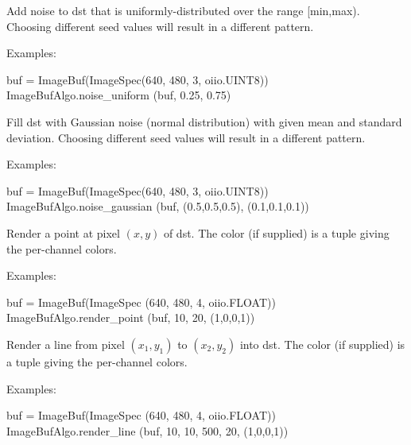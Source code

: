Add noise to {\cf dst} that is uniformly-distributed over the range
{\cf [min,max)}.  Choosing different seed values will result in a different pattern.

\smallskip
\noindent Examples:
\begin{code}
    buf = ImageBuf(ImageSpec(640, 480, 3, oiio.UINT8))
    ImageBufAlgo.noise_uniform (buf, 0.25, 0.75)
\end{code}
\apiend


 

Fill {\cf dst} with Gaussian noise (normal distribution) with given mean
and standard deviation.
Choosing different seed values will result in a different pattern.

\smallskip
\noindent Examples:
\begin{code}
    buf = ImageBuf(ImageSpec(640, 480, 3, oiio.UINT8))
    ImageBufAlgo.noise_gaussian (buf, (0.5,0.5,0.5), (0.1,0.1,0.1))
\end{code}
\apiend


 
\NEW %

Render a point at pixel $(x,y)$ of {\cf dst}.  The {\cf color} (if supplied)
is a tuple giving the per-channel colors.

\smallskip
\noindent Examples:
\begin{code}
    buf = ImageBuf(ImageSpec (640, 480, 4, oiio.FLOAT))
    ImageBufAlgo.render_point (buf, 10, 20, (1,0,0,1))
\end{code}
\apiend


 
\NEW %

Render a line from pixel $(x_1,y_1)$ to $(x_2,y_2)$ into {\cf dst}.  The
{\cf color} (if supplied) is a tuple giving the per-channel colors.

\smallskip
\noindent Examples:
\begin{code}
    buf = ImageBuf(ImageSpec (640, 480, 4, oiio.FLOAT))
    ImageBufAlgo.render_line (buf, 10, 10, 500, 20, (1,0,0,1))
\end{code}
\apiend



